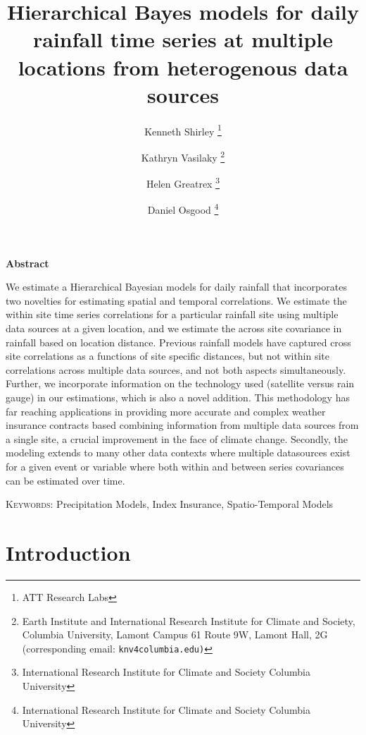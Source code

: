 \documentclass[11pt]{article}
\begin{document}
\title{Hierarchical Bayes models for daily rainfall time series at multiple locations from heterogenous data sources}
\author {Kenneth Shirley \thanks{ATT Research Labs}
\and Kathryn Vasilaky \thanks{Earth Institute and International Research Institute for Climate and Society, Columbia University, Lamont Campus 61 Route 9W, Lamont Hall, 2G (corresponding email: \tt{knv4columbia.edu})}
\and Helen Greatrex  \thanks{International Research Institute for Climate and Society Columbia University}
\and Daniel Osgood \thanks{International Research Institute for Climate and Society Columbia University}}


\maketitle

\newpage
\begin{center}
\textbf{Abstract}
\end{center}
We estimate a Hierarchical Bayesian models for daily rainfall that incorporates two novelties for estimating spatial and temporal correlations. We estimate the within site time series correlations for a particular rainfall site using multiple data sources at a given location, and we estimate the across site covariance in rainfall based on location distance. Previous rainfall models have captured cross site correlations as a functions of site specific distances, but not within site correlations across multiple data sources, and not both aspects simultaneously. Further, we incorporate information on the technology used (satellite versus rain gauge) in our estimations, which is also a novel addition. This methodology has far reaching applications in providing more accurate and complex weather insurance contracts based combining information from multiple data sources from a  single site,  a crucial improvement in the face of climate change. Secondly, the modeling extends to many other data contexts where multiple datasources exist for a given event or variable where both within and between series covariances can be estimated over time.

\vspace*{.3in}

\noindent\textsc{Keywords}: {Precipitation Models, Index Insurance, Spatio-Temporal Models}

\newpage

\section{Introduction}\label{sec:intro}
\end{document}
